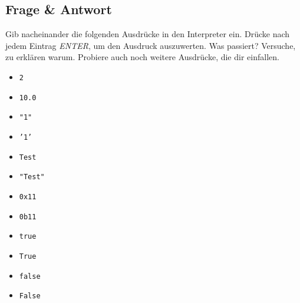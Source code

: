 \subsection{Frage \& Antwort}

Gib nacheinander die folgenden Ausdrücke in den Interpreter ein. Drücke nach
jedem Eintrag \textit{ENTER}, um den Ausdruck auszuwerten. Was passiert?
Versuche, zu erklären warum. Probiere auch noch weitere Ausdrücke, die dir
einfallen.

\begin{multicols}{3}
    \begin{itemize}
        \item \texttt{2}
        \item \texttt{10.0}
        \item \texttt{"1"}
        \item \texttt{'1'}
        \item \texttt{Test}
        \item \texttt{"Test"}
        \item \texttt{0x11}
        \item \texttt{0b11}
        \item \texttt{true}
        \item \texttt{True}
        \item \texttt{false}
        \item \texttt{False}
    \end{itemize}
\end{multicols}


